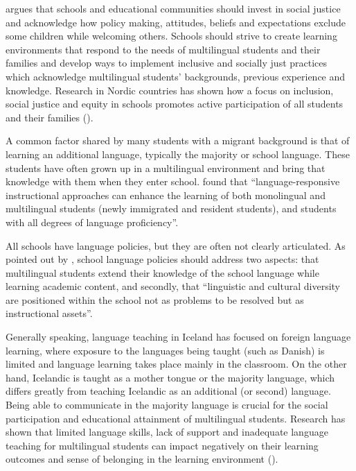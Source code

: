 \documentclass[output=paper]{langscibook}
\begin{document}
\begin{sloppypar}
\citet{Cummins2000} argues that schools and educational communities should invest in social justice and acknowledge how policy making, attitudes, beliefs and expectations exclude some children while welcoming others. Schools should strive to create learning environments that respond to the needs of multilingual students and their families and develop ways to implement inclusive and socially just practices which acknowledge multilingual students’ backgrounds, previous experience and knowledge. Research in Nordic countries has shown how a focus on inclusion, social justice and equity in schools promotes active participation of all students and their families (\citealt{LefeverEtAl2018,RagnarsdottirKulbrandstad2018,Tran2016-1,Ragnarsdottir2014-1}).
\end{sloppypar}

A common factor shared by many students with a migrant background is that of learning an additional language, typically the majority or school language. These students have often grown up in a multilingual environment and bring that knowledge with them when they enter school. \citet[18]{Prediger2023-1} found that “language-responsive instructional approaches can enhance the learning of both monolingual and multilingual students (newly immigrated and resident students), and students with all degrees of language proficiency”.

All schools have language policies, but they are often not clearly articulated. As pointed out by \citet[7]{CumminsEarly2015}, school language policies should address two aspects: that multilingual students extend their knowledge of the school language while learning academic content, and secondly, that “linguistic and cultural diversity are positioned within the school not as problems to be resolved but as instructional assets”.

Generally speaking, language{ teaching in Iceland has focused on foreign language learning, where exposure to the languages being taught (such as Danish) is limited and language learning takes place mainly in the classroom. On the other hand, Icelandic is taught as a mother tongue or the majority language, which differs greatly from teaching Icelandic as an additional (or second) language.  Being able to communicate in the majority language is crucial for the social participation and educational attainment of multilingual students. Research has shown that limited language skills, lack of support and inadequate language teaching for multilingual students can impact negatively on their learning outcomes and sense of belonging in the learning environment} (\citealt{SinacoreLerner2013}){.}
\end{document}
